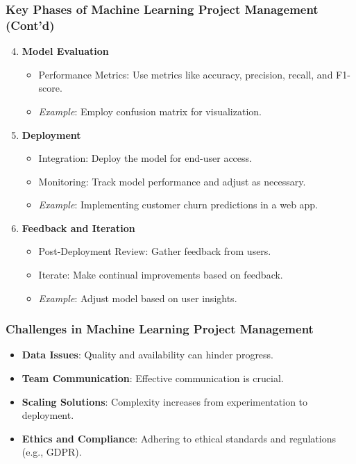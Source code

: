 \documentclass[aspectratio=169]{beamer}
\begin{document}
\begin{frame}[fragile]
    \frametitle{Key Phases of Machine Learning Project Management (Cont'd)}
    \begin{enumerate}
        \setcounter{enumi}{3} %
        \item \textbf{Model Evaluation}
        \begin{itemize}
            \item Performance Metrics: Use metrics like accuracy, precision, recall, and F1-score.
            \item \textit{Example}: Employ confusion matrix for visualization.
        \end{itemize}
        
        \item \textbf{Deployment}
        \begin{itemize}
            \item Integration: Deploy the model for end-user access.
            \item Monitoring: Track model performance and adjust as necessary.
            \item \textit{Example}: Implementing customer churn predictions in a web app.
        \end{itemize}

        \item \textbf{Feedback and Iteration}
        \begin{itemize}
            \item Post-Deployment Review: Gather feedback from users.
            \item Iterate: Make continual improvements based on feedback.
            \item \textit{Example}: Adjust model based on user insights.
        \end{itemize}
    \end{enumerate}
\end{frame}

\begin{frame}[fragile]
    \frametitle{Challenges in Machine Learning Project Management}
    \begin{itemize}
        \item \textbf{Data Issues}: Quality and availability can hinder progress.
        \item \textbf{Team Communication}: Effective communication is crucial.
        \item \textbf{Scaling Solutions}: Complexity increases from experimentation to deployment.
        \item \textbf{Ethics and Compliance}: Adhering to ethical standards and regulations (e.g., GDPR).
    \end{itemize}
\end{frame}
\end{document}
